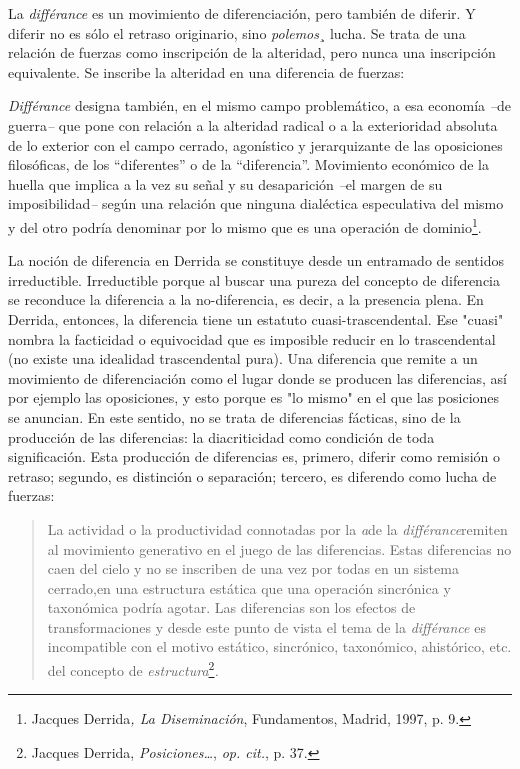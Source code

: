 \documentclass{book}
\begin{document}
La \emph{différance} es un movimiento de diferenciación, pero también de
diferir. Y diferir no es sólo el retraso originario, sino
\emph{polemos}¸ lucha. Se trata de una relación de fuerzas como
inscripción de la alteridad, pero nunca una inscripción equivalente. Se
inscribe la alteridad en una diferencia de fuerzas:

\emph{Différance} designa también, en el mismo campo problemático, a esa
economía \emph{--}de guerra\emph{--} que pone con relación a la
alteridad radical o a la exterioridad absoluta de lo exterior con el
campo cerrado, agonístico y jerarquizante de las oposiciones
filosóficas, de los ``diferentes'' o de la ``diferencia''. Movimiento
económico de la huella que implica a la vez su señal y su desaparición
\emph{--}el margen de su imposibilidad\emph{--} según una relación que
ninguna dialéctica especulativa del mismo y del otro podría denominar
por lo mismo que es una operación de dominio\footnote{Jacques
  Derrida\emph{, La Diseminación}, Fundamentos, Madrid, 1997, p. 9.}.

La noción de diferencia en Derrida se constituye desde un entramado de
sentidos irreductible. Irreductible porque al buscar una pureza del
concepto de diferencia se reconduce la diferencia a la no-diferencia, es
decir, a la presencia plena. En Derrida, entonces, la diferencia tiene
un estatuto cuasi-trascendental. Ese "cuasi" nombra la facticidad o
equivocidad que es imposible reducir en lo trascendental (no existe una
idealidad trascendental pura). Una diferencia que remite a un movimiento
de diferenciación como el lugar donde se producen las diferencias, así
por ejemplo las oposiciones, y esto porque es "lo mismo" en el que las
posiciones se anuncian. En este sentido, no se trata de diferencias
fácticas, sino de la producción de las diferencias: la diacriticidad
como condición de toda significación. Esta producción de diferencias es,
primero, diferir como remisión o retraso; segundo, es distinción o
separación; tercero, es diferendo como lucha de fuerzas:

\begin{quote}
La actividad o la productividad connotadas por la \emph{a}de la
\emph{différance}remiten al movimiento generativo en el juego de las
diferencias. Estas diferencias no caen del cielo y no se inscriben de
una vez por todas en un sistema cerrado,en una estructura estática que
una operación sincrónica y taxonómica podría agotar. Las diferencias son
los efectos de transformaciones y desde este punto de vista el tema de
la \emph{différance} es incompatible con el motivo estático, sincrónico,
taxonómico, ahistórico, etc. del concepto de
\emph{estructura}\footnote{Jacques Derrida, \emph{Posiciones\ldots{}},
  \emph{op. cit.}, p. 37.}\emph{.}
\end{quote}
\end{document}
